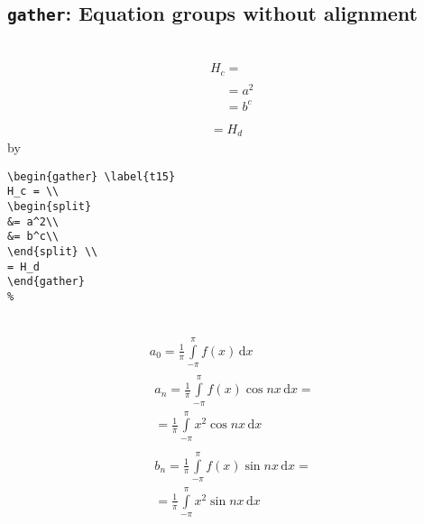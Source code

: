 \subsection{\texttt{\Large gather}: Equation groups without alignment}
%
\par \raggedright{}\\
%
\begin{gather} \label{t16}
	H_c = \\
	\begin{split}
		&= a^2\\
		&= b^c\\
	\end{split}
	\\
	= H_d
\end{gather}
%
by
%
\begin{verbatim}
\begin{gather} \label{t15}
H_c = \\
\begin{split}
&= a^2\\
&= b^c\\
\end{split} \\
= H_d
\end{gather}
%
\end{verbatim}
%
%
%
\par \raggedright{}\\
%
%
\begin{gather*}
	a_0=\frac{1}{\pi}\int\limits_{-\pi}^{\pi}f(x)\,\mathrm{d}x\\[6pt]
	\begin{split}
		a_n=\frac{1}{\pi}\int\limits_{-\pi}^{\pi}f(x)\cos nx\,\mathrm{d}x=\\
		=\frac{1}{\pi}\int\limits_{-\pi}^{\pi}x^2\cos nx\,\mathrm{d}x
	\end{split}\\[6pt]
	\begin{split}
		b_n=\frac{1}{\pi}\int\limits_{-\pi}^{\pi}f(x)\sin nx\,\mathrm{d}x=\\
		=\frac{1}{\pi}\int\limits_{-\pi}^{\pi}x^2\sin nx\,\mathrm{d}x
	\end{split}\\[6pt]
\end{gather*}
